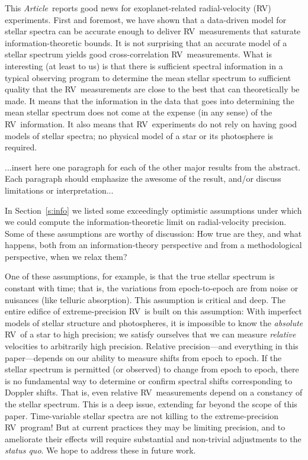 \documentclass[modern]{aastex62}
\newcommand{\documentname}{\textsl{Article}}
\newcommand{\sectionname}{Section}
\newcommand{\acronym}[1]{{\small{#1}}}
\newcommand{\RV}{\acronym{RV}}
\newcommand{\foreign}[1]{\textsl{#1}}
\begin{document}
This \documentname\ reports good news for exoplanet-related
radial-velocity (\RV) experiments.
First and foremost, we have shown that a data-driven model for
stellar spectra can be accurate enough to deliver
\RV\ measurements that saturate information-theoretic
bounds.
It is not surprising that an accurate model of a stellar spectrum
yields good cross-correlation \RV\ measurements.
What is interesting (at least to us) is that there is sufficient
spectral information in a typical observing
program to determine the mean stellar spectrum to sufficient
quality that the \RV\ measurements are close to the best that can
theoretically be made.
It means that the information in the data that goes into determining
the mean stellar spectrum does not come at the expense (in any sense)
of the \RV\ information.
It also means that \RV\ experiments do not rely on having good models
of stellar spectra; no physical model of a star or its photosphere
is required.

...insert here one paragraph for each of the other major results from
the abstract. Each paragraph should emphasize the awesome of the
result, and/or discuss limitations or interpretation...

In \sectionname~\ref{s:info} we listed some exceedingly
optimistic assumptions under which we could compute the
information-theoretic limit on radial-velocity precision.
Some of these assumptions are worthy of discussion: How true are they,
and what happens, both from an information-theory perspective and from
a methodological perspective, when we relax them?

One of these assumptions, for example, is that the true stellar
spectrum is constant with time; that is, the variations from
epoch-to-epoch are from noise or nuisances (like telluric absorption).
This assumption is critical and deep.
The entire edifice of extreme-precision \RV\ is built on this assumption:
With imperfect models of stellar structure and photospheres, it is
impossible to know the \emph{absolute} \RV\ of a star to high precision;
we satisfy ourselves that we can measure \emph{relative} velocities
to arbitrarily high precision.
Relative precision---and everything in this paper---depends on our
ability to measure shifts from epoch to epoch.
If the stellar spectrum is permitted (or observed) to change from epoch
to epoch, there is no fundamental way to determine or confirm spectral
shifts corresponding to Doppler shifts.
That is, even relative \RV\ measurements depend on a constancy of the
stellar spectrum.
This is a deep issue, extending far beyond the scope of this paper.
Time-variable stellar spectra are not killing to the extreme-precision
\RV\ program!
But at current practices they may be limiting precision,
and to ameliorate their effects will require substantial and non-trivial adjustments to the
\foreign{status quo}.
We hope to address these in future work.
\end{document}
